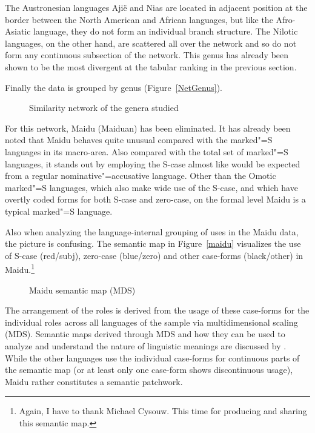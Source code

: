 The Austronesian languages Aji\"e and Nias are located in adjacent position at the border between the North American and African languages, but like the Afro-Asiatic language, they do not form an individual branch structure.
The Nilotic languages, on the other hand, are scattered all over the network and so do not form any continuous subsection of the network.
This genus has already been shown to be the most divergent at the tabular ranking in the previous section.


Finally the data is grouped by genus (Figure~\vref{NetGenus}). 
\begin{figure}[h,t,b,p] \centering {}%
\caption{Similarity network of the genera studied}\label{NetGenus}
\end{figure}
For this network, Maidu (Maiduan) has been eliminated.
It has already been noted that Maidu behaves quite unusual compared with the marked"=S languages in its macro-area.
Also compared with the total set of marked"=S languages, it stands out by employing the S-case almost like would be expected from a regular nominative"=accusative language. 
Other than the Omotic marked"=S languages, which also make wide use of the S-case, and which have overtly coded forms for both S-case and zero-case, on the formal level Maidu is a typical marked"=S language. 
\enlargethispage{\baselineskip}

Also when analyzing the language-internal grouping of uses in the Maidu data, the picture is confusing. 
The semantic map in Figure~\vref{maidu} visualizes the use of S-case (red/subj), zero-case
(blue/zero) and other case-forms (black/other) in Maidu.\footnote{Again, I have to thank
  Michael Cysouw. This time for producing and sharing this semantic map.}  
\begin{figure}[h,t,b] \centering {}%
\caption{Maidu semantic map (MDS)}\label{maidu}
\end{figure}
The arrangement of the roles is derived from the usage of these case-forms for the individual roles across all languages of the sample via multidimensional scaling (MDS). 
Semantic maps derived through MDS and how they can be used to analyze and understand the nature of linguistic meanings are discussed by \citet{Cysouw:2010}.
While the other languages use the individual case-forms for continuous parts of the semantic map (or at least only one case-form shows discontinuous usage), Maidu rather constitutes a semantic patchwork.  


